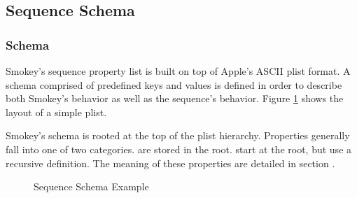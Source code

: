 \subsection{Sequence Schema}
\label{sec:SequenceSchema}

\subsubsection{Schema}

Smokey's sequence property list is built on top of Apple's ASCII plist format.
A schema comprised of predefined keys and values is defined in order to
describe both Smokey's behavior as well as the sequence's behavior.  Figure
\ref{fig:SequenceSchema} shows the layout of a simple plist.

Smokey's schema is rooted at the top of the plist hierarchy.  Properties
generally fall into one of two categories.   are
stored in the root.   start at the root, but use a
recursive definition.  The meaning of these properties are detailed in section
.

\begin{figure}[h]

	\begin{CenteredPropertyList}{20em}
	\end{CenteredPropertyList}

	\caption{Sequence Schema Example}
	\label{fig:SequenceSchema}

\end{figure}

